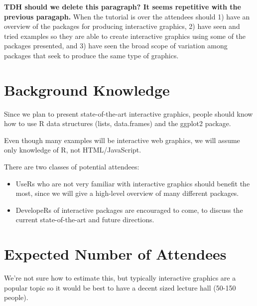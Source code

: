 \documentclass[11pt]{article}
\begin{document}
\textbf{TDH should we delete this paragraph? It seems repetitive with the previous paragaph.} When the tutorial is over the attendees should 1)
have an overview of the packages for producing interactive
graphics, 2) have seen and tried examples so they are able to create
interactive graphics using some of the packages presented, and 3) have
seen the broad scope of variation among packages that seek to produce
the same type of graphics.

\section{Background Knowledge}
\label{sec:orgheadline12}

Since we plan to present state-of-the-art interactive graphics, people
should know how to use R data structures (lists, data.frames) and the
ggplot2 package. 

Even though many examples will be interactive web graphics, we will
assume only knowledge of R, not HTML/JavaScript.

There are two classes of potential attendees:
\begin{itemize}
\item UseRs who are not very familiar with interactive graphics should
benefit the most, since we will give a high-level overview of many
different packages.
\item DevelopeRs of interactive packages are encouraged to come, to
discuss the current state-of-the-art and future directions.
\end{itemize}

\section{Expected Number of Attendees}
\label{sec:orgheadline13}

We're not sure how to estimate this, but typically interactive
graphics are a popular topic so it would be best to have a decent
sized lecture hall (50-150 people).
\end{document}
